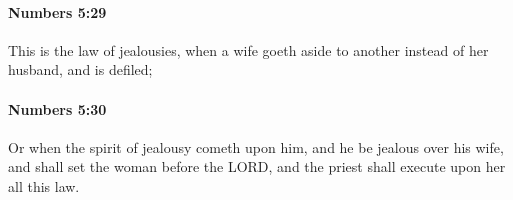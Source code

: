 		\paragraph{Numbers 5:29} %
			\label{NUMBERS-5-29}

			This is the law of jealousies, when a wife goeth aside to another instead of her husband, and is defiled;


		\paragraph{Numbers 5:30} %
			\label{NUMBERS-5-30}

			Or when the spirit of jealousy cometh upon him, and he be jealous over his wife, and shall set the woman before the LORD, and the priest shall execute upon her all this law.


